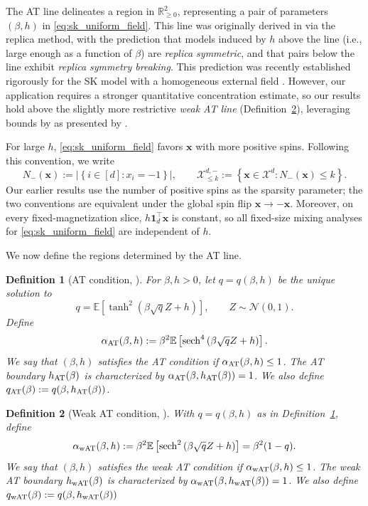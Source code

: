 \documentclass[11pt]{article}
\newtheorem{definition}{Definition}
\newcommand{\defeq}{:=}
\newcommand{\R}{\mathbb{R}}
\newcommand{\1}{\mathbf{1}}
\newcommand{\0}{\mathbf{0}}
\newcommand{\Par}[1]{\left(#1\right)}
\newcommand{\Brack}[1]{\left[#1\right]}
\newcommand{\Brace}[1]{\left\{#1\right\}}
\newcommand{\Abs}[1]{\left|#1\right|}
\newcommand{\vx}{{\mathbf{x}}}
\newcommand{\calX}{{\mathcal{X}}}
\newcommand{\bbE}{{\mathbb{E}}}
\newcommand{\wAT}{_{\rm wAT}}
\newcommand{\AT}{_{\rm AT}}
\begin{document}
The AT line delineates a region in $\R^2_{\ge 0}$, representing a pair of parameters $(\beta, h)$ in \eqref{eq:sk_uniform_field}. This line was originally derived in \cite{deAlmeidaThouless78} via the replica method, with the prediction that models induced by $h$ above the line (i.e., large enough as a function of $\beta$) are \emph{replica symmetric}, and that pairs below the line exhibit \emph{replica symmetry breaking}. This prediction was recently established rigorously for the SK model with a homogeneous external field \cite{Lopatto26}. However, our application requires a stronger quantitative concentration estimate, so our results hold above the slightly more restrictive \emph{weak AT line} (Definition~\ref{def:wat_cond}), leveraging bounds by \cite{Talagrand11, JagannathTobasco17} as presented by \cite{rajaraman2026markov}.

For large $h$, \eqref{eq:sk_uniform_field} favors $\vx$ with more positive spins. Following this convention, we write
\[
    N_-(\vx)
    \defeq
    \Abs{\Brace{i\in[d]:x_i=-1}},
    \qquad
    \calX_{\le k}^{d,-}
    \defeq
    \Brace{\vx\in\calX^d:N_-(\vx)\le k}.
\]
Our earlier results use the number of positive spins as the sparsity
parameter; the two conventions are equivalent under the global spin flip
$\vx\to-\vx$. Moreover, on every fixed-magnetization slice, $h\1_d^\top \vx$ is constant, so all fixed-size mixing analyses for \eqref{eq:sk_uniform_field} are
independent of $h$.

We now define the regions determined by the AT line.

\begin{definition}[AT condition, \cite{deAlmeidaThouless78}]
    \label{def:at_cond}
    For $\beta,h>0$, let $q=q(\beta,h)$ be the unique solution to
    \[
        q
        =
        \bbE\Brack{
            \tanh^2
            \Par{
                \beta\sqrt q Z+h
            }
        },
        \qquad
        Z\sim\mathcal N(0,1).
    \]
    Define
    \[
        \alpha_{\rm AT}(\beta,h)
        \defeq
        \beta^2
        \bbE\Brack{
            \operatorname{sech}^4
            \Par{
                \beta\sqrt q Z+h
            }
        }.
    \]
    We say that $(\beta,h)$ satisfies the AT condition if
    $\alpha_{\rm AT}(\beta,h)\le1$. The AT boundary
    $h_{\rm AT}(\beta)$ is characterized by
    $\alpha_{\rm AT}(\beta,h_{\rm AT}(\beta))=1$. We also define $q\AT(\beta) \defeq q(\beta, h\AT(\beta))$.
\end{definition}

\begin{definition}[Weak AT condition, \cite{brennecke2022replica}]
    \label{def:wat_cond}
    With $q=q(\beta,h)$ as in Definition~\ref{def:at_cond}, define
    \[
        \alpha_{\rm wAT}(\beta,h)
        \defeq
        \beta^2
        \bbE\Brack{
            \operatorname{sech}^2
            \Par{
                \beta\sqrt q Z+h
            }
        }
        =
        \beta^2(1-q).
    \]
    We say that $(\beta,h)$ satisfies the weak AT condition if
    $\alpha_{\rm wAT}(\beta,h) \le 1$. The weak AT boundary
    $h_{\rm wAT}(\beta)$ is characterized by
    $\alpha_{\rm wAT}(\beta,h_{\rm wAT}(\beta))=1$. We also define $q\wAT(\beta) \defeq q(\beta, h\wAT(\beta))$
\end{definition}
\end{document}
